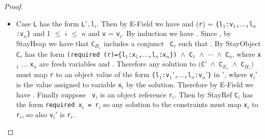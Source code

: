 \begin{proof}
\begin{itemize}
\begin{itemize}
 \item {\sc StayRef}:  Then 
{\tt C$_x$} has the form {\tt required x=v} and {\tt v} is an object reference {\tt
  r}.
  Therefore any solution to  {\tt $($C$'$ $\wedge$ C$_{E_s}$ $\wedge$
      C$_{H_s}$$)$} must map {\tt x} to {\tt r} in
    {\tt \Euid$'$}, and the result follows by {\sc E-Var}.
\end{itemize}
\item Case {\tt L} has the form {\tt L$'$.l$_i$}.  Then by {\sc
    E-Field} we have  and
  \texttt{\Huid}(\texttt{r}) =
  \texttt{\{l$_1$:v$_1$,$\ldots$,l$_n$:v$_n$\}} and
  1 $\leq$ $i$ $\leq$ $n$ and {\tt v} = {\tt v$_i$}.  By induction we have
.  Since , by
  {\sc StayHeap} we have that {\tt C$_{H_s}$} includes a conjunct {\tt
    C$_r$} such that .
By {\sc StayObject} {\tt C$_r$} has the form {\tt (required \Deref(r)=\{l$_1$:x$_1$,$\ldots$,l$_n$:x$_n$\}) $\wedge$
    C$_{1}$ $\wedge$
    $\cdots$ $\wedge$
    C$_{n}$}, where {\tt x$_1$} $\ldots$ {\tt x$_n$} are fresh
  variables and .  Therefore any solution to {\tt $($C$'$ $\wedge$ C$_{E_s}$ $\wedge$
      C$_{H_s}$$)$} must map {\tt r} to an object value of the form
    {\tt  \{l$_1$:v$_1'$,$\ldots$,l$_n$:v$_n'$\}} in {\tt \Huid$'$},
    where {\tt v$_i'$} is the value assigned to variable {\tt x$_i$}
    by the solution.
    Therefore by {\sc E-Field} we have
    .  Finally  suppose {\tt
      v$_i$} is an object reference {\tt r$_i$}.  Then by {\sc
      StayRef} {\tt C$_i$} has the form {\tt required x$_i$ = r$_i$} so any
    solution to the constraints must map  {\tt x$_i$} to {\tt r$_i$},
    so also {\tt v$_i'$} is {\tt r$_i$}.
\end{itemize}
\end{proof}



